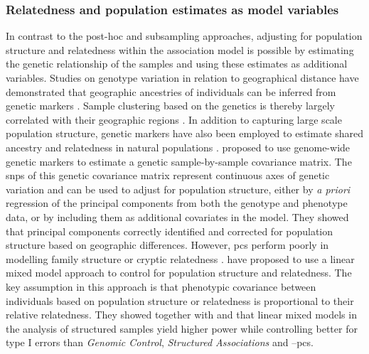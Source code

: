 \subsubsection{Relatedness and population estimates as model variables}
\label{subsubsection:relatedness-model-variables}
In contrast to the post-hoc and subsampling approaches, adjusting for population structure and relatedness within the association model is possible by estimating the genetic relationship of the samples and using these estimates as additional variables. Studies on genotype variation in relation to geographical distance have demonstrated that geographic ancestries of individuals can be inferred from genetic markers \citep{Rosenberg2002,Tang2005}. Sample clustering based on the genetics is thereby largely correlated with their geographic regions \citep{Rosenberg2005}. In addition to capturing large scale population structure, genetic markers have also been employed to estimate shared ancestry and relatedness in natural populations \citep{Lynch1999,Ritland2000,Thomas2005}. \citet{Price2006} proposed to use genome-wide genetic markers to estimate a genetic sample-by-sample covariance matrix. The \glspl{snp}  of this genetic covariance matrix represent continuous axes of genetic variation and can be used to adjust for population structure, either by \textit{a priori} regression of the principal components from both the genotype and phenotype data, or by including them as additional covariates in the model. They showed that principal components correctly identified and corrected for population structure based on geographic differences. However, \glspl{pc} perform poorly in modelling family structure or cryptic relatedness  \citep{Yu2006,Zhao2007,Kang2010,Casale2015}. \citet{Yu2006} have proposed to use a linear mixed model approach to control for population structure and relatedness. The key assumption in this approach is that phenotypic covariance between individuals based on population structure or relatedness is proportional to their relative relatedness. They showed together with \citet{Malosetti2007} and \citet{Zhao2007} that linear mixed models in the analysis of structured samples yield higher power while controlling better for type I errors than \textit{Genomic Control}, \textit{Structured Associations} and --\glspl{pc}.

